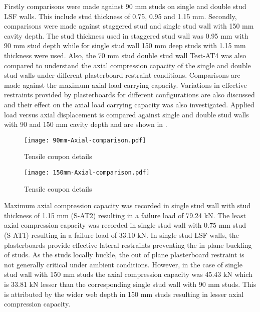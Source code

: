 Firstly comparisons were made against 90 mm studs on single and double stud LSF walls. This include stud thickness of 0.75, 0.95 and 1.15 mm. Secondly, comparisons were made against staggered stud and single stud wall with 150 mm cavity depth. The stud thickness used in staggered stud wall was 0.95 mm with 90 mm stud depth while for single stud wall 150 mm deep studs with 1.15 mm thickness were used. Also, the 70 mm stud double stud wall Test-AT4 was also compared to understand the axial compression capacity of the single and double stud walls under different plasterboard restraint conditions. Comparisons are made against the maximum axial load carrying capacity. Variations in effective restraints provided by plasterboards for different configurations are also discussed and their effect on the axial load carrying capacity was also investigated. Applied load versus axial displacement is compared against single and double stud walls with 90 and 150 mm cavity depth and are shown in .
\begin{figure}[!htbp]
	\centering
			\texttt{[image: 90mm-Axial-comparison.pdf]}\\
		\caption{Tensile coupon details}
		\label{fig:90mm-comparison-ambient}
\end{figure}
\begin{figure}[!htbp]
	\centering
			\texttt{[image: 150mm-Axial-comparison.pdf]}\\
		\caption{Tensile coupon details}
		\label{fig:150mm-comparison-ambient}
\end{figure}

Maximum axial compression capacity was recorded in single stud wall with stud thickness of 1.15 mm (S-AT2) resulting in a failure load of 79.24 kN. The least axial compression capacity was recorded in single stud wall with 0.75 mm stud (S-AT1) resulting in a failure load of 33.10 kN. In single stud LSF walls, the plasterboards provide effective lateral restraints preventing the in plane buckling of studs. As the studs locally buckle, the out of plane plasterboard restraint is not generally critical under ambient conditions. However, in the case of single stud wall with 150 mm studs the axial compression capacity was 45.43 kN which is 33.81 kN lesser than the corresponding single stud wall with 90 mm studs. This is attributed by the wider web depth in 150 mm studs resulting in lesser axial compression capacity.

